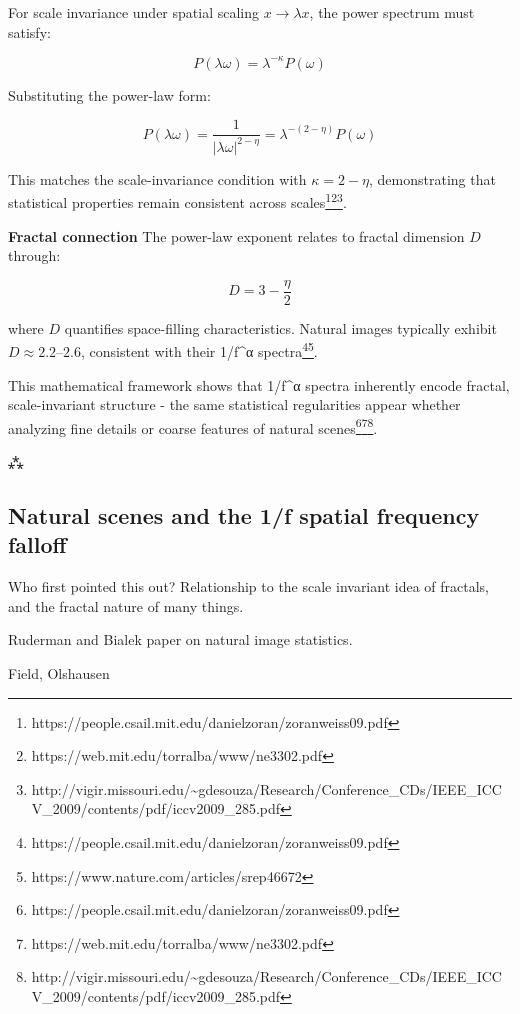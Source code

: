 \documentclass[
  letterpaper,
]{book}
\begin{document}
For scale invariance under spatial scaling \(x \to \lambda x\), the
power spectrum must satisfy:

\[
P(\lambda\omega) = \lambda^{-\kappa}P(\omega)
\]

Substituting the power-law form:

\[
P(\lambda\omega) = \frac{1}{|\lambda\omega|^{2-\eta}} = \lambda^{-(2-\eta)}P(\omega)
\]

This matches the scale-invariance condition with \(\kappa = 2-\eta\),
demonstrating that statistical properties remain consistent across
scales\footnote{https://people.csail.mit.edu/danielzoran/zoranweiss09.pdf}\footnote{https://web.mit.edu/torralba/www/ne3302.pdf}\footnote{http://vigir.missouri.edu/\textasciitilde gdesouza/Research/Conference\_CDs/IEEE\_ICCV\_2009/contents/pdf/iccv2009\_285.pdf}.

\textbf{Fractal connection} The power-law exponent relates to fractal
dimension \(D\) through:

\[
D = 3 - \frac{\eta}{2}
\]

where \(D\) quantifies space-filling characteristics. Natural images
typically exhibit \(D \approx 2.2\text{--}2.6\), consistent with their
1/f\^{}α spectra\footnote{https://people.csail.mit.edu/danielzoran/zoranweiss09.pdf}\footnote{https://www.nature.com/articles/srep46672}.

This mathematical framework shows that 1/f\^{}α spectra inherently
encode fractal, scale-invariant structure - the same statistical
regularities appear whether analyzing fine details or coarse features of
natural scenes\footnote{https://people.csail.mit.edu/danielzoran/zoranweiss09.pdf}\footnote{https://web.mit.edu/torralba/www/ne3302.pdf}\footnote{http://vigir.missouri.edu/\textasciitilde gdesouza/Research/Conference\_CDs/IEEE\_ICCV\_2009/contents/pdf/iccv2009\_285.pdf}.

⁂

\subsection{Natural scenes and the 1/f spatial frequency
falloff}\label{natural-scenes-and-the-1f-spatial-frequency-falloff}

Who first pointed this out? Relationship to the scale invariant idea of
fractals, and the fractal nature of many things.

Ruderman and Bialek paper on natural image statistics.

Field, Olshausen
\end{document}
